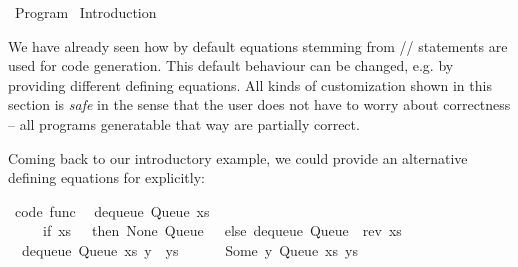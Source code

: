 %
\begin{isabellebody}%
\def\isabellecontext{Program}%
%
\isadelimtheory
%
\endisadelimtheory
%
\isatagtheory
{}\isamarkupfalse%
\ Program\isanewline
{}\ Introduction\isanewline
{}%
\endisatagtheory
{\isafoldtheory}%
%
\isadelimtheory
%
\endisadelimtheory
%
\isamarkuptrue%
%
\isamarkuptrue%
%
\begin{isamarkuptext}%
We have already seen how by default equations stemming from
  \hyperlink{command.definition}{\mbox{}}/\hyperlink{command.primrec}{\mbox{}}/\hyperlink{command.fun}{\mbox{}}
  statements are used for code generation.  This default behaviour
  can be changed, e.g. by providing different defining equations.
  All kinds of customization shown in this section is \emph{safe}
  in the sense that the user does not have to worry about
  correctness -- all programs generatable that way are partially
  correct.%
\end{isamarkuptext}%
\isamarkuptrue%
%
\isamarkuptrue%
%
\begin{isamarkuptext}%
Coming back to our introductory example, we
  could provide an alternative defining equations for 
  explicitly:%
\end{isamarkuptext}%
\isamarkuptrue%
%
\isadelimquoteme
%
\endisadelimquoteme
%
\isatagquoteme
{}\isamarkupfalse%
\ {\isacharbrackleft}code\ func{\isacharbrackright}{\isacharcolon}\isanewline
\ \ {\isachardoublequoteopen}dequeue\ {\isacharparenleft}Queue\ xs\ {\isacharbrackleft}{\isacharbrackright}{\isacharparenright}\ {\isacharequal}\isanewline
\ \ \ \ \ {\isacharparenleft}if\ xs\ {\isacharequal}\ {\isacharbrackleft}{\isacharbrackright}\ then\ {\isacharparenleft}None{\isacharcomma}\ Queue\ {\isacharbrackleft}{\isacharbrackright}\ {\isacharbrackleft}{\isacharbrackright}{\isacharparenright}\ else\ dequeue\ {\isacharparenleft}Queue\ {\isacharbrackleft}{\isacharbrackright}\ {\isacharparenleft}rev\ xs{\isacharparenright}{\isacharparenright}{\isacharparenright}{\isachardoublequoteclose}\isanewline
\ \ {\isachardoublequoteopen}dequeue\ {\isacharparenleft}Queue\ xs\ {\isacharparenleft}y\ {\isacharhash}\ ys{\isacharparenright}{\isacharparenright}\ {\isacharequal}\isanewline
\ \ \ \ \ {\isacharparenleft}Some\ y{\isacharcomma}\ Queue\ xs\ ys{\isacharparenright}{\isachardoublequoteclose}\isanewline

\end{isabellebody}
